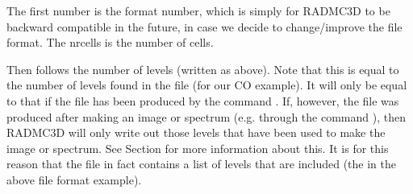 \documentclass[letterpaper,10pt,english]{sphinxmanual}
\begin{document}
\begin{sphinxVerbatim}[commandchars=\\\{\}]
                                      
                            
\PYG{p}{[}\PYG{p}{]}  \PYG{p}{[}\PYG{p}{]}          
\PYG{p}{[}\PYG{p}{]}  \PYG{p}{[}\PYG{p}{]}          
\PYG{p}{[}\PYG{p}{]}   \PYG{p}{[}\PYG{p}{]} 
\end{sphinxVerbatim}

The first number is the format number, which is simply for RADMC\sphinxhyphen{}3D to be
backward compatible in the future, in case we decide to change/improve the
file format. The nrcells is the number of cells.

Then follows the number of levels (written as  above). Note
that this is  equal to the number of levels found in the
 file (for our CO example). It will only be equal to that if
the file has been produced by the command . If, however, the
file was produced after making an image or spectrum (e.g. through the command
), then RADMC\sphinxhyphen{}3D will only write out those
levels that have been used to make the image or spectrum. See Section
{\hyperref[\detokenize{lineradtrans:sec-calcstore-levpop}]{}} for more information about this. It is for this
reason that the file in fact contains a list of levels that are included (the
 in the above file format example).
\end{document}
